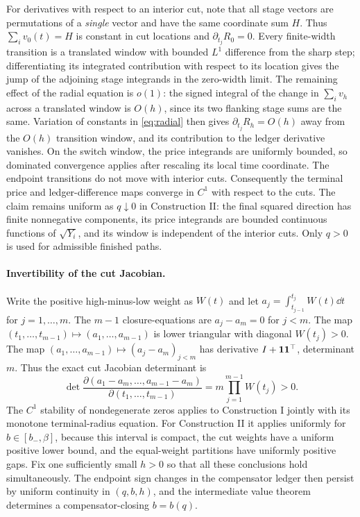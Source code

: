 \documentclass[review,hidelinks,onefignum,onetabnum]{siamonline250211}%
\begin{document}
For derivatives with respect to an interior cut, note that
all stage vectors are permutations of a \emph{single} vector
and have the same coordinate sum $H$. Thus $\sum_i v_0(t)=H$
is constant in cut locations and $\partial_{t_j}R_0=0$.
Every finite-width transition is a translated window with
bounded $L^1$ difference from the sharp step; differentiating its
integrated contribution with respect to its location gives the
jump of the adjoining stage integrands in the zero-width limit.
The remaining effect of the radial equation is $o(1)$:
the signed integral of the change in $\sum_i v_h$ across a
translated window is $O(h)$, since its two flanking stage sums
are the same. Variation of constants in \eqref{eq:radial}
then gives $\partial_{t_j}R_h=O(h)$ away from the $O(h)$
transition window, and its contribution to the ledger derivative
vanishes. On the switch window, the price integrands are uniformly
bounded, so dominated convergence applies after rescaling its
local time coordinate. The endpoint transitions do not move with
interior cuts. Consequently the terminal price and ledger-difference
maps converge in $C^1$ with respect to the cuts. The claim remains
uniform as $q\downarrow0$ in Construction II: the final squared
direction has finite nonnegative components, its price integrands
are bounded continuous functions of $\sqrt{Y_i}$, and its window is
independent of the interior cuts. Only $q>0$ is used for admissible
finished paths.

\paragraph{Invertibility of the cut Jacobian.}
Write the positive high-minus-low weight as $W(t)$ and let
$a_j=\int_{t_{j-1}}^{t_j}W(t)\dd t$ for $j=1,\ldots,m$.
The $m-1$ closure-equations are $a_j-a_m=0$ for $j<m$.
The map $(t_1,\ldots,t_{m-1})\mapsto(a_1,\ldots,a_{m-1})$
is lower triangular with diagonal $W(t_j)>0$.
The map $(a_1,\ldots,a_{m-1})\mapsto(a_j-a_m)_{j<m}$
has derivative $I+\mathbf{1}\mathbf{1}^\top$, determinant $m$.
Thus the exact cut Jacobian determinant is
\begin{equation}\label{eq:cutdet}
 \det\frac{\partial(a_1-a_m,\ldots,a_{m-1}-a_m)}
 {\partial(t_1,\ldots,t_{m-1})}
 =m\prod_{j=1}^{m-1}W(t_j)>0.
\end{equation}
The $C^1$ stability of nondegenerate zeros applies to
Construction I jointly with its monotone terminal-radius equation.
For Construction II it applies uniformly for
$b\in[b_-,\beta]$, because this interval is compact, the cut
weights have a uniform positive lower bound, and the equal-weight
partitions have uniformly positive gaps. Fix one sufficiently small
$h>0$ so that all these conclusions hold simultaneously.
The endpoint sign changes in the compensator ledger then persist
by uniform continuity in $(q,b,h)$, and the intermediate value
theorem determines a compensator-closing $b=b(q)$.
\end{document}
